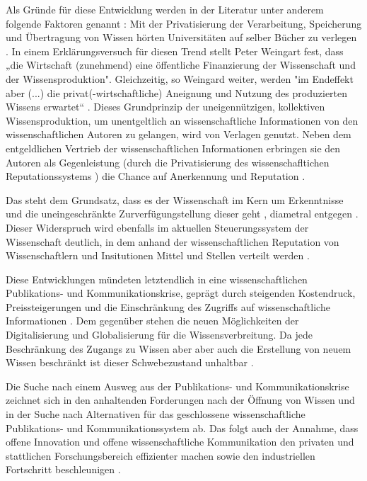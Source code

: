 Als Gründe für diese Entwicklung werden in der Literatur unter anderem folgende Faktoren genannt \cite{suchen}: Mit der Privatisierung der Verarbeitung, Speicherung und Übertragung von Wissen hörten Universitäten auf selber Bücher zu verlegen \cite{cite:0}. In einem Erklärungsversuch für diesen Trend stellt Peter Weingart fest, dass „die Wirtschaft (zunehmend) eine öffentliche Finanzierung der Wissenschaft und der Wissensproduktion". Gleichzeitig, so Weingard weiter, werden "im Endeffekt aber (...) die privat(-wirtschaftliche) Aneignung und Nutzung des produzierten Wissens erwartet“ \cite{cite:2}. Dieses Grundprinzip der uneigennützigen, kollektiven Wissensproduktion, um unentgeltlich an wissenschaftliche Informationen von den wissenschaftlichen Autoren zu gelangen, wird von Verlagen genutzt. Neben dem entgeldlichen Vertrieb der wissenschaftlichen Informationen erbringen sie den Autoren als Gegenleistung (durch die Privatisierung des wissenschafltichen Reputationssystems \cite{suchen}) die Chance auf Anerkennung und Reputation \cite{cite:21a}. 

Das steht dem Grundsatz, dass es der Wissenschaft im Kern um Erkenntnisse und die uneingeschränkte Zurverfügungstellung dieser geht \cite{hanekop_2006}, diametral entgegen \cite{offhaus_2012_institutionelle_repos}. Dieser Widerspruch wird ebenfalls im aktuellen Steuerungssystem der Wissenschaft deutlich, in dem anhand der wissenschaftlichen Reputation von Wissenschaftlern und Insitutionen Mittel und Stellen verteilt werden \cite{cite:4}.

Diese Entwicklungen mündeten letztendlich in eine wissenschaftlichen Publikations- und Kommunikationskrise, geprägt durch steigenden Kostendruck, Preissteigerungen und die Einschränkung des Zugriffs auf wissenschaftliche Informationen \cite{Hess_2006}. Dem gegenüber stehen die neuen Möglichkeiten der Digitalisierung und Globalisierung für die Wissensverbreitung. Da jede Beschränkung des Zugangs zu Wissen aber aber auch die Erstellung von neuem Wissen beschränkt \cite{cite:5} \cite{cite:8} ist dieser Schwebezustand unhaltbar \cite{suchen}. 

Die Suche nach einem Ausweg aus der Publikations- und Kommunikationskrise zeichnet sich in den anhaltenden Forderungen nach der Öffnung von Wissen und in der Suche nach Alternativen für das geschlossene wissenschaftliche Publikations- und Kommunikationssystem ab. Das folgt auch der Annahme, dass offene Innovation und offene wissenschaftliche Kommunikation den privaten und stattlichen Forschungsbereich effizienter machen sowie den industriellen Fortschritt beschleunigen \cite{cite:7}. 


